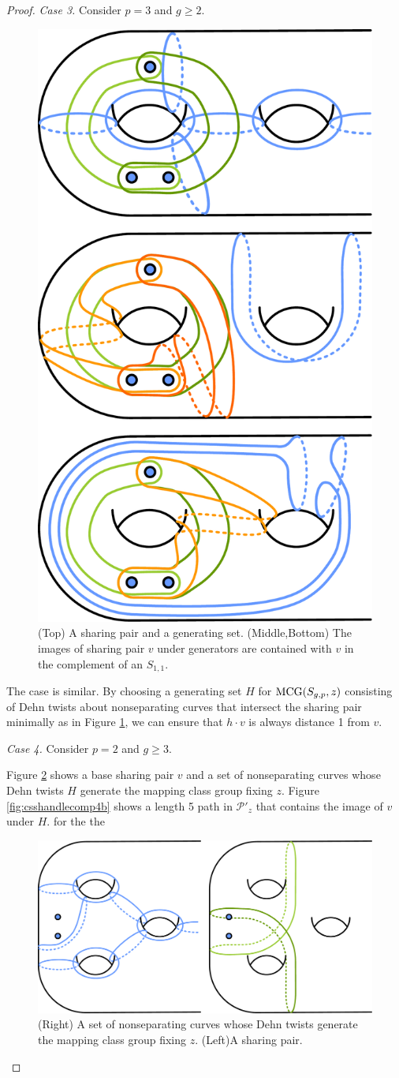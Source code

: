 \begin{proof}
  \emph{Case 3.} Consider $p=3$ and $g \geq 2$.

  \begin{figure}[h!]
    \centering
    \includegraphics[width=.4\textwidth]{figures/handlecompliment3.pdf}
    \caption{(Top) A sharing pair and a generating set. (Middle,Bottom)
    The images of sharing pair $v$ under generators are contained with $v$ in the complement of an $S_{1,1}$.}
    \label{fig:csshandlecomp3}
  \end{figure}

  The case is similar. By choosing a generating set $H$ for $\operatorname{MCG} (S_{g,p},z)$
  consisting
  of Dehn twists about nonseparating curves
  that intersect the sharing pair minimally as in Figure \ref{fig:csshandlecomp3}, we can ensure
  that $h \cdot v$ is always distance 1 from $v$.




  \emph{Case 4.} Consider $p=2$ and $g \geq 3$.

  Figure \ref{fig:csshandlecomp4} shows a base sharing pair $v$
  and a set of nonseparating curves whose Dehn twists $H$ generate the mapping class group fixing $z$.
  Figure \ref{fig:csshandlecomp4b} shows a length 5 path in $\mathcal P'_z$
  that contains the image of $v$ under $H$.
for the the
  \begin{figure}[h!]
    \centering
    \includegraphics[width=\textwidth]{figures/handlecompliment4.pdf}
    \caption{(Right) A set of nonseparating curves whose Dehn twists generate the mapping class group fixing $z$. (Left)A sharing pair.}
    \label{fig:csshandlecomp4}
  \end{figure}


\end{proof}
